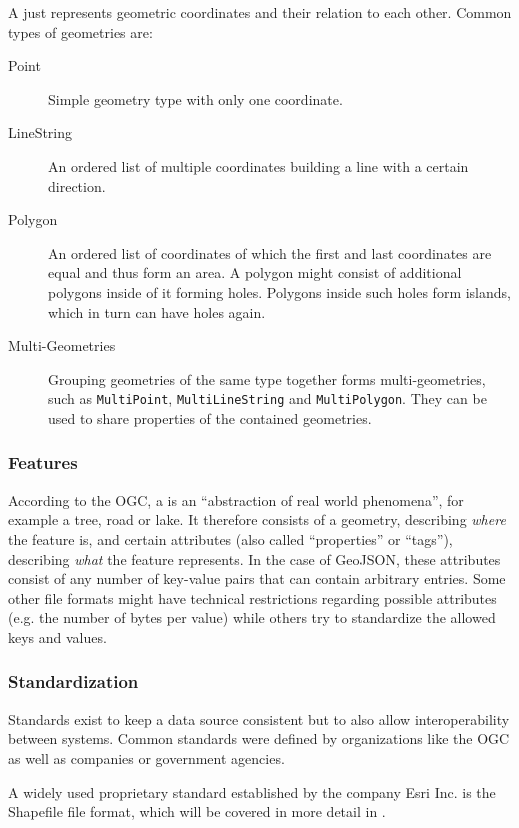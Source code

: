 			A  just represents geometric coordinates and their relation to each other.
			Common types of geometries are:
			\begin{description}
				\item[Point] Simple geometry type with only one coordinate.
				\item[LineString] An ordered list of multiple coordinates building a line with a certain direction.
				\item[Polygon] An ordered list of coordinates of which the first and last coordinates are equal and thus form an area. A polygon might consist of additional polygons inside of it forming holes. Polygons inside such holes form islands, which in turn can have holes again.
				\item[Multi-Geometries] Grouping geometries of the same type together forms multi-geometries, such as \texttt{MultiPoint}, \texttt{MultiLineString} and \texttt{MultiPolygon}. They can be used to share properties of the contained geometries.
			\end{description}
		
		\subsubsection{Features}
		
			According to the OGC, a  is an \enquote{abstraction of real world phenomena}\cite{ogc-sfa}, for example a tree, road or lake.
			It therefore consists of a geometry, describing \textit{where} the feature is, and certain attributes (also called \enquote{properties} or \enquote{tags}), describing \textit{what} the feature represents.
			In the case of GeoJSON, these attributes consist of any number of key-value pairs that can contain arbitrary entries.
			Some other file formats might have technical restrictions regarding possible attributes (e.g. the number of bytes per value) while others try to standardize the allowed keys and values.
		
		\subsubsection{Standardization}
		
			Standards exist to keep a data source consistent but to also allow interoperability between systems.
			Common standards were defined by organizations like the OGC as well as companies or government agencies.
			
			A widely used proprietary standard established by the company Esri Inc. is the Shapefile file format, which will be covered in more detail in .
			
